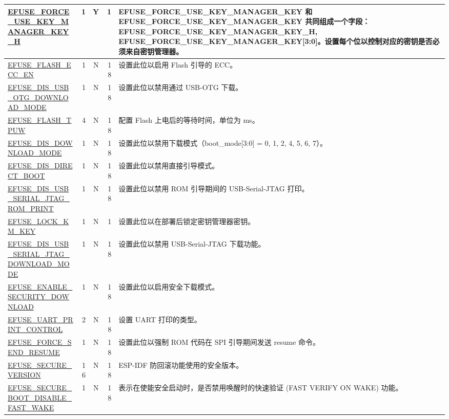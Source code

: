 \begin{longtable}[l]{ |m{8.2cm}|r|c|r|m{9cm}| }
    \hyperref[fielddesc:EFUSEFORCEUSEKEYMANAGERKEYH]{EFUSE\_FORCE\_USE\_KEY\_MANAGER\_KEY\_H} & 1 & Y & 1 & EFUSE\_FORCE\_USE\_KEY\_MANAGER\_KEY 和 EFUSE\_FORCE\_USE\_KEY\_MANAGER\_KEY 共同组成一个字段：{EFUSE\_FORCE\_USE\_KEY\_MANAGER\_KEY\_H, EFUSE\_FORCE\_USE\_KEY\_MANAGER\_KEY[3:0]}。设置每个位以控制对应的密钥是否必须来自密钥管理器。  \\ \hline
    \hyperref[fielddesc:EFUSEFLASHECCEN]{EFUSE\_FLASH\_ECC\_EN} & 1 & N & 18 & 设置此位以启用 Flash 引导的 ECC。 \\ \hline
    \hyperref[fielddesc:EFUSEDISUSBOTGDOWNLOADMODE]{EFUSE\_DIS\_USB\_OTG\_DOWNLOAD\_MODE} & 1 & N & 18 & 设置此位以禁用通过 USB-OTG 下载。 \\ \hline
    \hyperref[fielddesc:EFUSEFLASHTPUW]{EFUSE\_FLASH\_TPUW} & 4 & N & 18 & 配置 Flash 上电后的等待时间，单位为 ms。\\ \hline
    \hyperref[fielddesc:EFUSEDISDOWNLOADMODE]{EFUSE\_DIS\_DOWNLOAD\_MODE} & 1 & N & 18 & 设置此位以禁用下载模式（boot\_mode[3:0] = 0, 1, 2, 4, 5, 6, 7）。 \\ \hline
    \hyperref[fielddesc:EFUSEDISDIRECTBOOT]{EFUSE\_DIS\_DIRECT\_BOOT} & 1 & N & 18 & 设置此位以禁用直接引导模式。 \\ \hline
    \hyperref[fielddesc:EFUSEDISUSBSERIALJTAGROMPRINT]{EFUSE\_DIS\_USB\_SERIAL\_JTAG\_ROM\_PRINT} & 1 & N & 18 & 设置此位以禁用 ROM 引导期间的 USB-Serial-JTAG 打印。 \\ \hline
    \hyperref[fielddesc:EFUSELOCKKMKEY]{EFUSE\_LOCK\_KM\_KEY} & 1 & N & 1 & 设置此位以在部署后锁定密钥管理器密钥。 \\ \hline
    \hyperref[fielddesc:EFUSEDISUSBSERIALJTAGDOWNLOADMODE]{EFUSE\_DIS\_USB\_SERIAL\_JTAG\_DOWNLOAD\_MODE} & 1 & N & 18 & 设置此位以禁用 USB-Serial-JTAG 下载功能。 \\ \hline
    \hyperref[fielddesc:EFUSEENABLESECURITYDOWNLOAD]{EFUSE\_ENABLE\_SECURITY\_DOWNLOAD} & 1 & N & 18 & 设置此位以启用安全下载模式。 \\ \hline
    \hyperref[fielddesc:EFUSEUARTPRINTCONTROL]{EFUSE\_UART\_PRINT\_CONTROL} & 2 & N & 18 & 设置 UART 打印的类型。 \\ \hline
    \hyperref[fielddesc:EFUSEFORCESENDRESUME]{EFUSE\_FORCE\_SEND\_RESUME} & 1 & N & 18 & 设置此位以强制 ROM 代码在 SPI 引导期间发送 resume 命令。 \\ \hline
    \hyperref[fielddesc:EFUSESECUREVERSION]{EFUSE\_SECURE\_VERSION} & 16 & N & 18 & ESP-IDF 防回滚功能使用的安全版本。 \\ \hline
    \hyperref[fielddesc:EFUSESECUREBOOTDISABLEFASTWAKE]{EFUSE\_SECURE\_BOOT\_DISABLE\_FAST\_WAKE} & 1 & N & 18 & 表示在使能安全启动时，是否禁用唤醒时的快速验证 (FAST VERIFY ON WAKE) 功能。 \\ \hline

\end{longtable}
